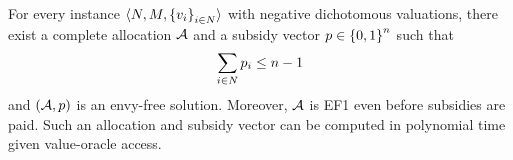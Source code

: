 





\begin{theorem}
\label{thm:m-main}
For every instance
$\langle N,M,\left\{v_i\right\}_{i\in N}\rangle$
with negative dichotomous valuations, there exist a complete allocation
$\mathcal{A}$ and a subsidy vector $p\in\left\{0,1\right\}^n$ such that
\[
    \sum_{i\in N}p_i\leq n-1
\]
and $(\mathcal{A},p)$ is an envy-free solution. Moreover, $\mathcal{A}$ is
EF1 even before subsidies are paid. Such an allocation and subsidy vector
can be computed in polynomial time given value-oracle access.
\end{theorem}

